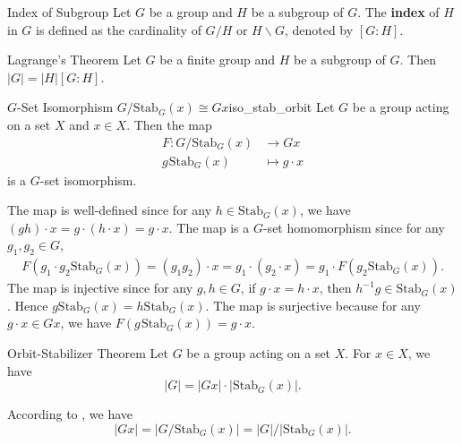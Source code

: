 \begin{definition}{Index of Subgroup}{}
    Let $G$ be a group and $H$ be a subgroup of $G$. The \textbf{index} of $H$ in $G$ is defined as the cardinality of $G/H$ or $H\backslash G$, denoted by $[G:H]$.
\end{definition}

\begin{theorem}{Lagrange's Theorem}{}
    Let $G$ be a finite group and $H$ be a subgroup of $G$. Then $|G|=|H|[G:H]$.
\end{theorem}


\begin{proposition}{$G$-Set Isomorphism $G/\mathrm{Stab}_G(x)\cong Gx$}{iso_stab_orbit}
    Let $G$ be a group acting on a set $X$ and $x\in X$. Then the map
    \begin{align*}
        F:G/\mathrm{Stab}_G(x)          & \longrightarrow Gx   \\
        g\hspace{1pt}\mathrm{Stab}_G(x) & \longmapsto g\cdot x
    \end{align*}
    is a $G$-set isomorphism.
\end{proposition}

\begin{prf}
    The map is well-defined since for any $h\in \mathrm{Stab}_G(x)$, we have $(gh)\cdot x=g\cdot (h\cdot x)=g\cdot x$. The map is a $G$-set homomorphism since for any $g_1,g_2\in G$,
    \begin{align*}
        F\left(g_1\cdot g_2\mathrm{Stab}_G(x)\right)=(g_1g_2)\cdot x=g_1\cdot(g_2\cdot x)=g_1\cdot F\left(g_2\mathrm{Stab}_G(x)\right).
    \end{align*}
    The map is injective since for any $g,h\in G$, if $g\cdot x=h\cdot x$, then $h^{-1}g\in \mathrm{Stab}_G(x)$. Hence $g\mathrm{Stab}_G(x)=h\mathrm{Stab}_G(x)$. The map is surjective because for any $g\cdot x\in Gx$, we have $F\left(g\hspace{1pt}\mathrm{Stab}_G(x)\right)=g\cdot x$.
\end{prf}

\begin{theorem}{Orbit-Stabilizer Theorem}{}
    Let $G$ be a group acting on a set $X$. For $x\in X$, we have
    \[
        |G|=|Gx|\cdot |\mathrm{Stab}_G(x)|    .
    \]
\end{theorem}

\begin{prf}
    According to , we have
    \[
        \left|Gx\right|=\left|G/\mathrm{Stab}_G(x)\right|=|G|/\left|\mathrm{Stab}_G(x)\right|.
    \]
\end{prf}

